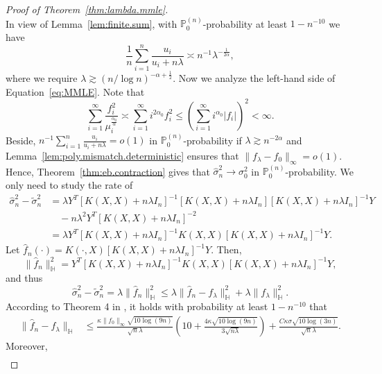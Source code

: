 \documentclass[12pt]{article}
\newcommand{\PP}{\mathbb{P}}
\newcommand{\bbH}{\mathbb{H}}
\newcommand{\s}{\sum_{i=1}^{\infty}}
\theoremstyle{plain}
\theoremstyle{nonitalicremark}
\begin{document}
\begin{appendices}
\begin{proof}[Proof of Theorem~\ref{thm:lambda.mmle}]
\begin{equation}
\end{equation}
In view of Lemma~\ref{lem:finite.sum}, with $\PP_0^{(n)}$-probability at least $1-n^{-10}$ we have
\begin{equation}
\frac{1}{n} \sum_{i=1}^n \frac{u_i}{u_i + n\lambda} \asymp n^{-1} \lambda^{-\frac{1}{2\alpha}},
\end{equation}
where we require $\lambda \gtrsim (n/\log n)^{-\alpha + \frac{1}{2}}$. Now we analyze the left-hand side of Equation~\eqref{eq:MMLE}. Note that
\begin{equation}
\s \frac{f_i^2}{\mu_i^{\frac{\alpha_0}{\alpha}}} \asymp \s i^{2\alpha_0}f_i^2 \leq \left( \s i^{\alpha_0}|f_i| \right)^2 < \infty.
\end{equation}
Beside, $n^{-1} \sum_{i=1}^n \frac{u_i}{u_i + n\lambda} = o(1)$ in $\PP_0^{(n)}$-probability if $\lambda \gtrsim n^{-2\alpha}$ and Lemma~\ref{lem:poly.mismatch.deterministic} ensures that $\|f_\lambda - f_0\|_\infty = o(1)$. Hence, Theorem~\ref{thm:eb.contraction} gives that $\hat\sigma_n^2 \rightarrow \sigma_0^2$ in $\PP_0^{(n)}$-probability. We only need to study the rate of
\begin{align}
\hat\sigma_n^2-\tilde\sigma_n^2 &= \lambda Y^T[K(X,X)+n\lambda I_n]^{-1} [K(X,X)+n\lambda I_n] [K(X,X)+n\lambda I_n]^{-1} Y \\
&\quad - n\lambda^2Y^T[K(X,X)+n\lambda I_n]^{-2}\\
&=\lambda Y^T[K(X,X)+n\lambda I_n]^{-1} K(X,X) [K(X,X)+n\lambda I_n]^{-1} Y.
\end{align}
Let $\hat f_n(\cdot) = K(\cdot, X)[K(X,X)+n\lambda I_n]^{-1} Y$. Then,
\begin{equation}
\|\hat f_n\|_{\bbH}^2 = Y^T [K(X,X)+n\lambda I_n]^{-1} K(X, X) [K(X,X)+n\lambda I_n]^{-1} Y,
\end{equation}
and thus
\begin{equation}
\hat\sigma_n^2-\tilde\sigma_n^2=\lambda\|\hat f_n\|_{\bbH}^2 \leq \lambda\|\hat f_n - f_\lambda\|_{\bbH}^2 + \lambda\| f_\lambda\|_{\bbH}^2.
\end{equation}
According to Theorem 4 in \cite{liu2020non}, it holds with probability at least $1-n^{-10}$ that
\begin{align}
\|\hat{f}_n-f_\lambda\|_\bbH &\leq\frac{\kappa \|f_0\|_\infty \sqrt{10\log(9n)}}{\sqrt{n}\lambda}  \left(10 + \frac{4 \kappa\sqrt{10\log(9n)}}{3 \sqrt{n\lambda}} \right)+\frac{C \kappa \sigma \sqrt{10\log(3n)}}{\sqrt{n} \lambda}.
\end{align}
Moreover,
\begin{align}

\end{align}
\end{proof}
\end{appendices}
\end{document}
